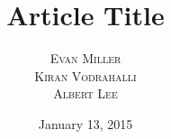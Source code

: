 \documentclass[twoside]{article}
\title{\vspace{-15mm}\fontsize{24pt}{10pt}\selectfont\textbf{Article Title}} %
\author{
\large
\textsc{Evan Miller}\\[2mm] 
\textsc{Kiran Vodrahalli}\\[2mm]
\textsc{Albert Lee}\\[2mm]
\vspace{-5mm}
}
\date{January 13, 2015}
\begin{document}
\maketitle %


\begin{abstract}

\noindent \lipsum[1] %

\end{abstract}

\end{document}
